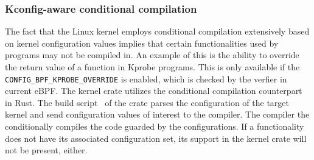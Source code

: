 \subsubsection{Kconfig-aware conditional compilation}
The fact that the Linux kernel employs conditional compilation extensively
    based on kernel configuration values implies that certain functionalities
    used by \projname{} programs may not be compiled in.
An example of this is the ability to override the return value of a function in
    Kprobe programs.
This is only available if the \texttt{CONFIG\_BPF\_KPROBE\_OVERRIDE} is
    enabled, which is checked by the verfier in current eBPF.
The \projname{} kernel crate utilizes the conditional compilation counterpart
    in Rust.
The build script~\cite{rust-build-script} of the crate parses the configuration
    of the target kernel and send configuration values of interest to the
    compiler.
The compiler the conditionally compiles the code guarded by the configurations.
If a functionality does not have its associated configuration set, its support
    in the kernel crate will not be present, either.

